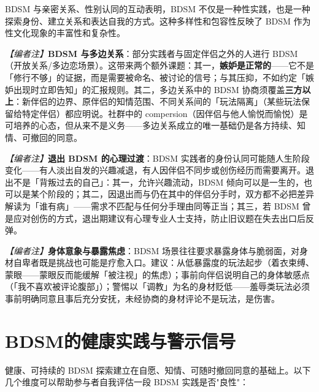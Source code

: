 \documentclass[12pt,UTF8]{ctexbook}
\begin{document}
BDSM 与亲密关系、性别认同的互动表明，BDSM 不仅是一种性实践，也是一种探索身份、建立关系和表达自我的方式。这种多样性和包容性反映了 BDSM 作为性文化现象的丰富性和复杂性。

\noindent\textit{【编者注】}\textbf{BDSM 与多边关系}：部分实践者与固定伴侣之外的人进行 BDSM（开放关系/多边恋场景）。这带来两个额外课题：其一，\textbf{嫉妒是正常的}——它不是「修行不够」的证据，而是需要被命名、被讨论的信号；与其压抑，不如约定「嫉妒出现时立即告知」的汇报规则。其二，多边关系中的 BDSM 协商须覆盖\textbf{三方以上}：新伴侣的边界、原伴侣的知情范围、不同关系间的「玩法隔离」（某些玩法保留给特定伴侣）都应明说。社群中的 compersion（因伴侣与他人愉悦而愉悦）是可培养的心态，但从来不是义务——多边关系成立的唯一基础仍是各方持续、知情、可撤回的同意。

\noindent\textit{【编者注】}\textbf{退出 BDSM 的心理过渡}：BDSM 实践者的身份认同可能随人生阶段变化——有人淡出自发的兴趣减退，有人因伴侣不同步或创伤经历而需要离开。退出不是「背叛过去的自己」：其一，允许兴趣流动，BDSM 倾向可以是一生的，也可以是某个阶段的；其二，因退出而与仍在其中的伴侣分手时，双方都不必把差异解读为「谁有病」——需求不匹配与任何分手理由同等正当；其三，若 BDSM 曾是应对创伤的方式，退出期建议有心理专业人士支持，防止旧议题在失去出口后反弹。

\noindent\textit{【编者注】}\textbf{身体意象与暴露焦虑}：BDSM 场景往往要求暴露身体与脆弱面，对身材自卑者既是挑战也可能是疗愈入口。建议：从低暴露度的玩法起步（着衣束缚、蒙眼——蒙眼反而能缓解「被注视」的焦虑）；事前向伴侣说明自己的身体敏感点（「我不喜欢被评论腹部」）；警惕以「调教」为名的身材贬低——羞辱类玩法必须事前明确同意且事后充分安抚，未经协商的身材评论不是玩法，是伤害。

\section{BDSM的健康实践与警示信号}

健康、可持续的 BDSM 探索建立在自愿、知情、可随时撤回同意的基础上。以下几个维度可以帮助参与者自我评估一段 BDSM 实践是否"良性"：
\end{document}

